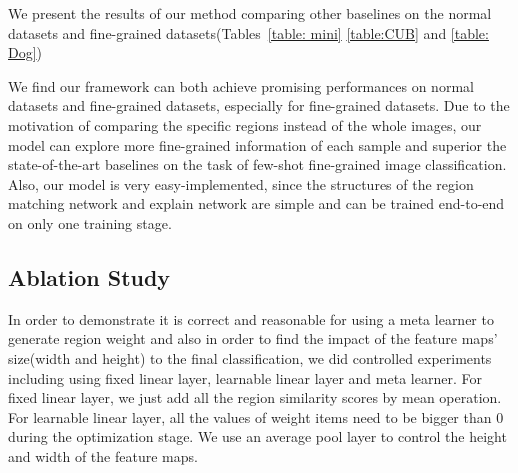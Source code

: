 \documentclass[letterpaper]{article}
\begin{document}
We  present  the  results  of  our  method  comparing other baselines on the normal datasets and  fine-grained datasets(Tables~\ref{table: mini} \ref{table:CUB} and \ref{table: Dog})

\begin{table}[t]
\begin{center}
\caption{Mean accuracies (\%) of different methods on the Stanford Dogs. Results are obtained over 600 test episodes with 95\% confidence intervals.
} 
\end{center}
\end{table}

We find our framework can both achieve promising performances on normal datasets and fine-grained datasets, especially for fine-grained datasets. Due to the motivation of comparing the specific regions instead of the whole images, our model can explore more fine-grained information of each sample and superior the state-of-the-art baselines on the task of few-shot fine-grained image classification. Also, our model is very easy-implemented, since the structures of the region matching network and explain network are simple and can be trained end-to-end on only one training stage.

\subsection{Ablation Study}\label{subsec:ablation}
In order to demonstrate it is correct and reasonable for using a meta learner to generate region weight and also in order to find the impact of the feature maps' size(width and height) to the final classification, we did controlled experiments including using fixed linear layer, learnable linear layer and meta learner. For fixed linear layer, we just add all the region similarity scores by mean operation. For learnable linear layer, all the values of weight items need to be bigger than 0 during the optimization stage. We use an average pool layer to control the height and width of the feature maps.
\end{document}
